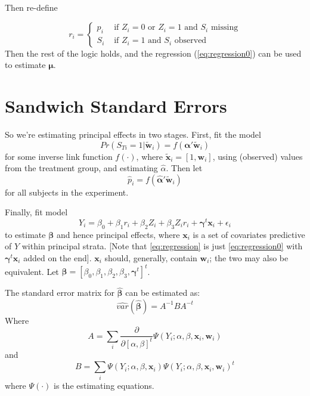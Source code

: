 \documentclass[11pt]{article} %
\begin{document}
Then re-define

\begin{equation}
  r_i=
  \begin{cases}
    p_i&\text{ if }Z_i=0\text{ or }Z_i=1\text{ and }S_i\text{ missing}\\
    S_i&\text{ if }Z_i=1\text{ and }S_i\text{ observed}
  \end{cases}
\end{equation}
Then the rest of the logic holds, and the regression (\ref{eq:regression0}) can be used to estimate $\bm{\mu}$.

\section{Sandwich Standard Errors}


So we're estimating principal effects in two stages.
First, fit the model
\begin{equation}\label{eq:psMod}
  Pr(S_{Ti}=1|\bm{\tilde{w}}_i)=f(\bm{\alpha}'\bm{\tilde{w}}_i)
\end{equation}
for some inverse link function $f(\cdot)$, where $\bm{\tilde{x}}_i=[1,\bm{w}_i]$, using (observed) values from the treatment group, and estimating $\hat{\alpha}$.
Then let
\begin{equation}\label{eq:ps}
  \hat{p}_i=f(\bm{\hat{\alpha}}'\bm{\tilde{w}}_i)
\end{equation}
for all subjects in the experiment. 

Finally, fit model
\begin{equation}\label{eq:regression}
  Y_i=\beta_0+\beta_1r_i+\beta_2Z_i+\beta_3Z_ir_i+\bm{\gamma}^t\bm{x}_i+\epsilon_i
\end{equation}
to estimate $\bm{\beta}$ and hence principal effects, where $\bm{x}_i$ is a set of covariates predictive of $Y$ within principal strata.
[Note that \eqref{eq:regression} is just \eqref{eq:regression0} with $\bm{\gamma}^t\bm{x}_i$ added on the end].
$\bm{x}_i$ should, generally, contain $\bm{w}_i$; the two may also be equivalent.
Let $\bm{\beta}=[\beta_0,\beta_1,\beta_2,\beta_3,\bm{\gamma}^t]^t$.

The standard error matrix for $\bm{\hat{\beta}}$ can be estimated as:
\begin{equation}\label{eq:sandwich}
  \widehat{var}(\bm{\hat{\beta}})=A^{-1}BA^{-t}
\end{equation}
Where
\begin{equation}\label{eq:Amat}
  A=\sum_i\frac{\partial}{\partial [\alpha,\beta]^t} \Psi(Y_i;\alpha,\beta,\bm{x}_i,\bm{w}_i)
\end{equation}
and
\begin{equation}\label{eq:Bmat}
  B=\sum_i \Psi(Y_i;\alpha,\beta,\bm{x}_i)\Psi(Y_i;\alpha,\beta,\bm{x}_i,\bm{w}_i)^t
\end{equation}
where $\Psi(\cdot)$ is the estimating equations.
\end{document}
